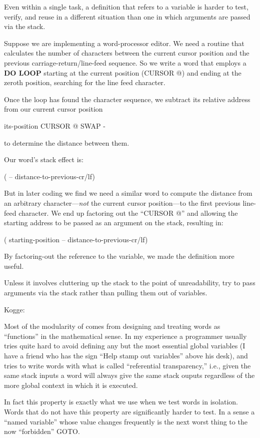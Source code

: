 Even within a single task, a definition that refers to a variable is
harder to test, verify, and reuse in a different situation than one in which
arguments are passed via the stack.

Suppose we are implementing a word-processor editor. We need a
routine that calculates the number of characters between the current cursor
position and the previous carriage-return/line-feed sequence. So we
write a word that employs a \textbf{DO LOOP} starting at the current position
(CURSOR @) and ending at the zeroth position, searching for the line
feed character.

Once the loop has found the character sequence, we subtract its
relative address from our current cursor position

\begin{Code}
its-position CURSOR @  SWAP -
\end{Code}
to determine the distance between them.

Our word's stack effect is:

\begin{Code}
( -- distance-to-previous-cr/lf)
\end{Code}
But in later coding we find we need a similar word to compute the
distance from an arbitrary character---\emph{not} the current cursor
position---to the first previous line-feed character. We end up factoring
out the ``CURSOR @'' and allowing the starting address to be passed as an
argument on the stack, resulting in:

\begin{Code}
( starting-position -- distance-to-previous-cr/lf)
\end{Code}
By factoring-out the reference to the variable, we made the definition
more useful.

\begin{tip}
Unless it involves cluttering up the stack to the point of unreadability, try
to pass arguments via the stack rather than pulling them out of variables.
\end{tip}
\begin{interview}
Kogge:
\begin{tfquot}
Most of the modularity of \Forth{} comes from designing and treating
\Forth{} words as ``functions'' in the mathematical sense. In my experience
a \Forth{} programmer usually tries quite hard to avoid defining any but
the most essential global variables (I have a friend who has the sign ``Help
stamp out variables'' above his desk), and tries to write words with what is
called ``referential transparency,'' i.e., given the same stack inputs a word
will always give the same stack ouputs regardless of the more global
context in which it is executed.

In fact this property is exactly what we use when we test words in isolation.
Words that do not have this property are significantly harder to test. In a
sense a ``named variable'' whose value changes frequently is the next worst
thing to the now ``forbidden'' GOTO.
\end{tfquot}
\end{interview}

